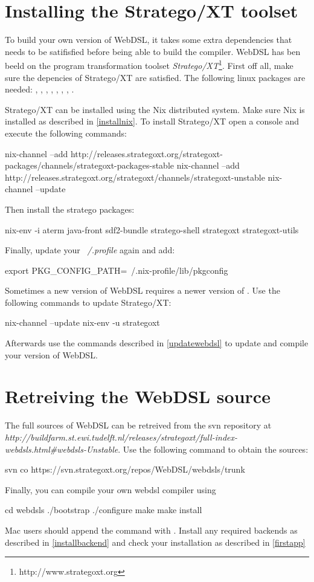 \section{Installing the Stratego/XT toolset}
To build your own version of WebDSL, it takes some extra dependencies that needs to be satifisfied before being able to build the compiler. WebDSL has ben beeld on the program transformation toolset \emph{Stratego/XT}\footnote{http://www.strategoxt.org}. First off all, make sure the depencies of Stratego/XT are satisfied. The following linux packages are needed:
, , , , , , , .

Stratego/XT can be installed using the Nix distributed system. Make sure Nix is installed as described in \ref{installnix}. To install Stratego/XT open a console and execute the following commands:
\begin{shell}
nix-channel --add http://releases.strategoxt.org/strategoxt-packages/channels/strategoxt-packages-stable
nix-channel --add http://releases.strategoxt.org/strategoxt/channels/strategoxt-unstable
nix-channel --update
\end{shell}
Then install the stratego packages:
\begin{shell}
nix-env -i aterm java-front sdf2-bundle stratego-shell strategoxt strategoxt-utils
\end{shell}
Finally, update your \emph{~/.profile} again and add:
\begin{shell}
export PKG_CONFIG_PATH=~/.nix-profile/lib/pkgconfig
\end{shell}

Sometimes a new version of WebDSL requires a newer version of . Use the following commands to update Stratego/XT:
\begin{shell}
nix-channel --update
nix-env -u strategoxt
\end{shell}
Afterwards use the commands described in \ref{updatewebdsl} to update and compile your version of WebDSL. 

\section{Retreiving the WebDSL source}
The full sources of WebDSL can be retreived from the svn repository at \\\emph{http://buildfarm.st.ewi.tudelft.nl/releases/strategoxt/full-index-webdsls.html\#webdsls-Unstable}. Use the following command to obtain the sources:
\begin{shell}
svn co  https://svn.strategoxt.org/repos/WebDSL/webdsls/trunk
\end{shell}
Finally, you can compile your own webdsl compiler using 
\begin{shell}
cd webdsls
./bootstrap
./configure
make
make install
\end{shell}
Mac users should append the  command with . Install any required backends as described in \ref{installbackend} and check your installation as described in \ref{firstapp}


